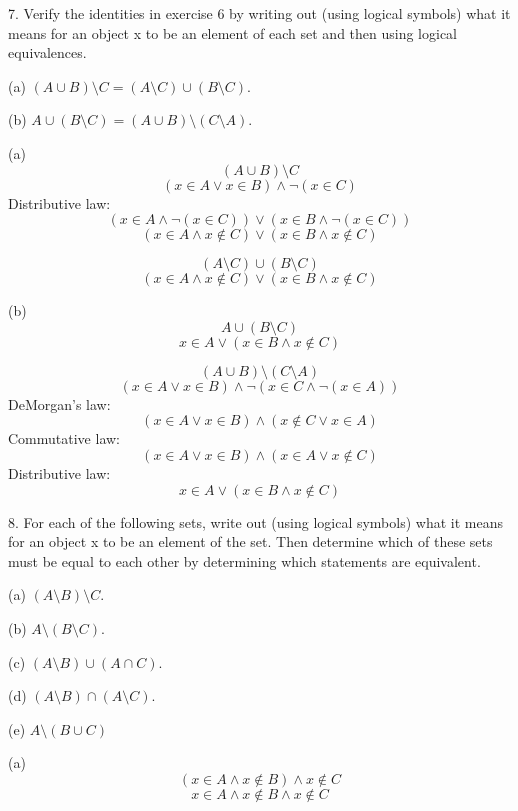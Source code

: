 \documentclass{article}
\begin{document}
7. Verify the identities in exercise 6 by writing out (using logical symbols)
what it means for an object x to be an element of each set and then using
logical equivalences.

\hspace{12pt}(a) $(A \cup B) \setminus C = (A \setminus C) \cup (B \setminus C)$.

\hspace{12pt}(b) $A \cup (B \setminus C) = (A \cup B) \setminus (C \setminus A)$.
\vspace{30pt}

(a) $$(A \cup B) \setminus C$$
$$(x \in A \lor x \in B) \land \neg (x \in C)$$
Distributive law: $$(x \in A \land \neg (x \in C)) \lor (x \in B \land \neg (x \in C))$$
$$(x \in A \land x \notin C) \lor (x \in B \land x \notin C)$$

$$(A \setminus C) \cup (B \setminus C)$$
$$(x \in A \land x \notin C) \lor (x \in B \land x \notin C)$$
\vspace{10pt}

(b) $$A \cup (B \setminus C)$$
$$x \in A \lor (x \in B \land x \notin C)$$

$$(A \cup B) \setminus (C \setminus A)$$
$$(x \in A \lor x \in B) \land \neg (x \in C \land \neg (x \in A))$$
DeMorgan's law: $$(x \in A \lor x \in B) \land (x \notin C \lor x \in A)$$
Commutative law: $$(x \in A \lor x \in B) \land (x \in A \lor x \notin C)$$
Distributive law: $$x \in A \lor (x \in B \land x \notin C)$$
\vspace{30pt}

8. For each of the following sets, write out (using logical symbols) what it
means for an object x to be an element of the set. Then determine which
of these sets must be equal to each other by determining which statements
are equivalent.

\hspace{12pt}(a) $(A \setminus B) \setminus C$.

\hspace{12pt}(b) $A \setminus (B \setminus C)$.

\hspace{12pt}(c) $(A \setminus B) \cup (A \cap C)$.

\hspace{12pt}(d) $(A \setminus B) \cap (A \setminus C)$.

\hspace{12pt}(e) $A \setminus (B \cup C)$
\vspace{30pt}

(a) $$(x \in A \land x \notin B) \land x \notin C$$
$$x \in A \land x \notin B \land x \notin C$$
\vspace{10pt}
\end{document}
